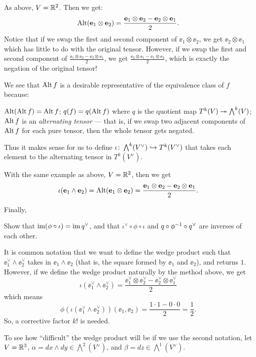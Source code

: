 \begin{example}
	As above, $V = \mathbb R^2$. Then we get:
	\[ \operatorname{Alt} (\mathbf e_1 \otimes \mathbf e_2) = \frac{\mathbf e_1 \otimes \mathbf e_2 - \mathbf e_2 \otimes \mathbf e_1}{2}. \]
	Notice that if we swap the first and second component of $\ee_1 \otimes \ee_2$, we get $\ee_2
	\otimes \ee_1$ which has little to do with the original tensor. However, if we swap
	the first and second component of $\frac{\ee_1 \otimes \ee_2 - \ee_2 \otimes \ee_1}{2}$, we get
	$\frac{\ee_2 \otimes \ee_1 - \ee_1 \otimes \ee_2}{2}$, which is exactly the negation of the
	original tensor!
\end{example}

We see that $\operatorname{Alt} f$ is a desirable representative of the equivalence class of $f$ because:
\begin{itemize}
	\ii $\operatorname{Alt} (\operatorname{Alt} f) = \operatorname{Alt} f$;
	\ii $q(f) = q(\operatorname{Alt} f)$ where $q$ is the quotient map $T^k(V) \twoheadrightarrow \bigwedge^k(V)$;
	\ii $\operatorname{Alt} f$ is an \emph{alternating tensor} --- that is, if we swap two adjacent components
	of $\operatorname{Alt} f$ for each pure tensor, then the whole tensor gets negated.
\end{itemize}
Thus it makes sense for us to define $\iota \colon \bigwedge^k(V^\vee) \hookrightarrow T^k(V^\vee)$
that takes each element to the alternating tensor in $T^k(V^\vee)$.
\begin{example}
	With the same example as above, $V = \mathbb R^2$, then we get
	\[
		\iota(\mathbf e_1 \wedge \mathbf e_2) = \operatorname{Alt}(\mathbf e_1 \otimes \mathbf e_2)
		= \frac{\mathbf e_1 \otimes \mathbf e_2 - \mathbf e_2 \otimes \mathbf e_1}{2}.
	\]
\end{example}
Finally,
\begin{exercise}
	Show that $\operatorname{im} (\phi \circ \iota) = \operatorname{im} q^\vee$, and that
	$\iota^\vee \circ \phi \circ \iota$ and $q \circ \phi^{-1} \circ q^\vee$
	are inverses of each other.
\end{exercise}

It is common notation that we want to define the wedge product such that
$\ee_1^\vee \wedge \ee_2^\vee$ takes in $\ee_1 \wedge \ee_2$ (that is, the square formed by $\ee_1$
and $\ee_2$), and returns $1$. However, if we define the wedge product naturally by the method
above, we get
\[
	\iota(\ee_1^\vee \wedge \ee_2^\vee)
	= \frac{\ee_1^\vee \otimes \ee_2^\vee - \ee_2^\vee \otimes \ee_1^\vee}{2}
\]
which means
\[
	\phi(\iota(\ee_1^\vee \wedge \ee_2^\vee))(\ee_1, \ee_2)
	= \frac{1 \cdot 1 - 0 \cdot 0}{2} = \frac{1}{2}.
\]
So, a corrective factor $k!$ is needed.

To see how ``difficult'' the wedge product will be if we use the second notation, let $V = \mathbb R^3$,
$\alpha = dx \wedge dy \in \bigwedge^2(V^\vee)$, and $\beta = dz \in \bigwedge^1(V^\vee)$.


